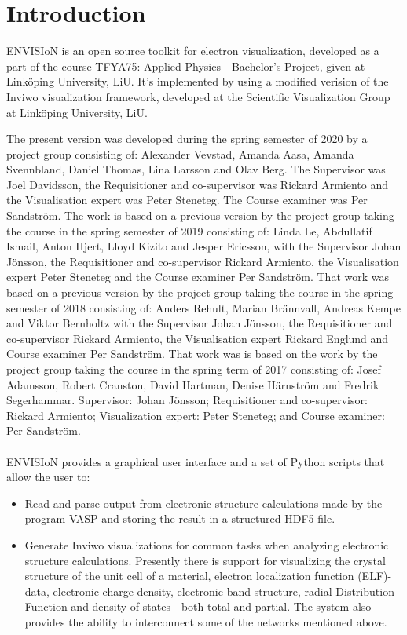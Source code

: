\section{Introduction}
\label{ch:intro}
ENVISIoN is an open source toolkit for electron visualization, developed as a part of the course TFYA75: Applied Physics - Bachelor's Project, given at Linköping University, LiU. It's implemented by using a modified verision of the Inviwo visualization framework, developed at the Scientific Visualization Group at Linköping University, LiU.

The present version was developed during the spring semester of 2020 by a project group consisting of: Alexander Vevstad, Amanda Aasa, Amanda Svennbland, Daniel Thomas, Lina Larsson and Olav Berg. The Supervisor was Joel Davidsson, the Requisitioner and co-supervisor was Rickard Armiento and the Visualisation expert was Peter Steneteg. The Course examiner was Per Sandström. The work is based on a previous version by the project group taking the course in the spring semester of 2019 consisting of: Linda Le, Abdullatif Ismail, Anton Hjert, Lloyd Kizito and Jesper Ericsson, with the Supervisor Johan Jönsson, the Requisitioner and co-supervisor Rickard Armiento, the Visualisation expert Peter Steneteg and the Course examiner Per Sandström. That work was based on a previous version by the project group taking the course in the spring semester of 2018 consisting of: Anders Rehult, Marian Brännvall, Andreas Kempe and Viktor Bernholtz with the Supervisor Johan Jönsson, the Requisitioner and co-supervisor Rickard Armiento, the Visualisation expert Rickard Englund and Course examiner Per Sandström. That work was is based on the work by the project group taking the course in the spring term of 2017 consisting of: Josef Adamsson, Robert Cranston, David Hartman, Denise Härnström and Fredrik Segerhammar. Supervisor: Johan Jönsson; Requisitioner and co-supervisor: Rickard Armiento; Visualization expert: Peter Steneteg; and Course examiner: Per Sandström.
\\\\
ENVISIoN provides a graphical user interface and a set of Python scripts that allow the user to:
\begin{itemize}
    \item Read and parse output from electronic structure calculations made by the program VASP and storing the result in a structured HDF5 file.
    
    \item Generate Inviwo visualizations for common tasks when analyzing electronic structure calculations. Presently there is support for visualizing the crystal structure of the unit cell of a material, electron localization function (ELF)-data, electronic charge density, electronic band structure, radial Distribution Function and density of states - both total and partial. The system also provides the ability to interconnect some of the networks mentioned above.
\end{itemize}